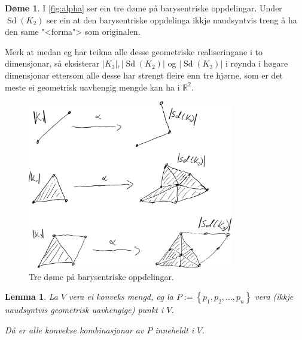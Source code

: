 \documentclass[a4paper, 12pt, norsk]{article}
\theoremstyle{plain}
\newtheorem{lemma}[theorem]{Lemma}
\theoremstyle{definition}
\newtheorem{example}[theorem]{Døme}
\newcommand{\Rb}{\mathbb{R}}
\newcommand{\gr}[1]{ \lvert #1 \rvert } %
\newcommand{\set}[1]{ \left\{ #1 \right\} } %
\DeclareMathOperator{\Sd}{Sd} %
\begin{document}
\begin{example}
	I \autoref{fig:alpha} ser ein tre døme på barysentriske oppdelingar. Under \( \Sd(K_2) \) ser ein at den barysentriske oppdelinga ikkje naudsyntvis treng å ha den same "<forma"> som originalen.
	
	Merk at medan eg har teikna alle desse geometriske realiseringane i to dimensjonar, så eksisterar \( \gr{K_3}, \gr{\Sd(K_2)} \) og \( \gr{\Sd(K_3)} \) i røynda i høgare dimensjonar ettersom alle desse har strengt fleire enn tre hjørne, som er det meste ei geometrisk uavhengig mengde kan ha i \( \Rb^2 \).
	\begin{figure}[htbp]
		\begin{center}
			\includegraphics[width=0.8\textwidth]{png/Alpha.png}
		\end{center}
		\caption{Tre døme på barysentriske oppdelingar.}
		\label{fig:alpha}
	\end{figure}
\end{example}

\begin{lemma} \label{thm:konveks-kombinasjon-i-konveks}
	La \( V \) vera ei konveks mengd, og la \( P := \set{p_1, p_2, \dots, p_n } \) vera (ikkje naudsyntvis geometrisk uavhengige) punkt i \( V \).
	
	Då er alle konvekse kombinasjonar av \( P \) inneheldt i \( V \).
\end{lemma}
\end{document}
